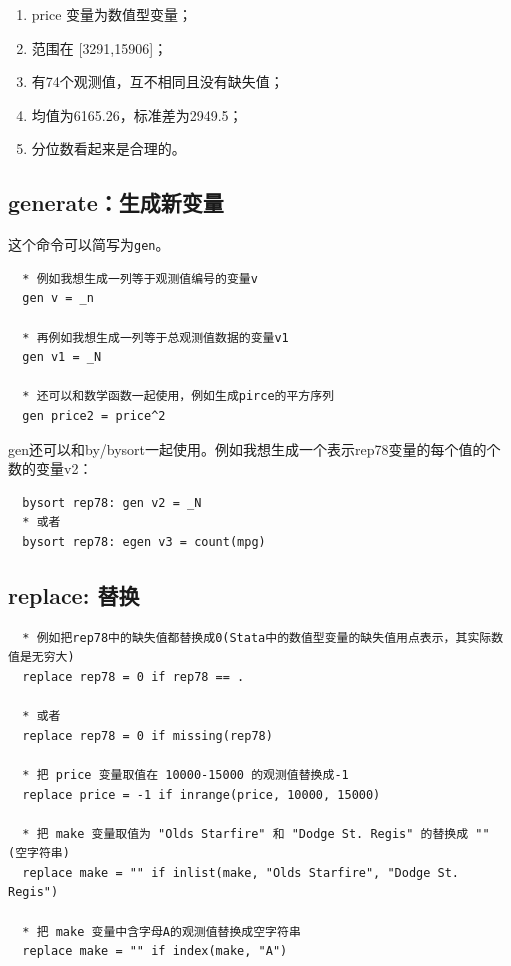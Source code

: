 \documentclass[cn,fancy,blue,11pt]{elegantbook}
\begin{document}
\begin{enumerate}
  \item price 变量为数值型变量；
  \item 范围在 {[}3291,15906{]}；
  \item 有74个观测值，互不相同且没有缺失值；
  \item 均值为6165.26，标准差为2949.5；
  \item 分位数看起来是合理的。
\end{enumerate}

\subsection{generate：生成新变量}
这个命令可以简写为\texttt{gen}。

\begin{lstlisting}
  * 例如我想生成一列等于观测值编号的变量v
  gen v = _n

  * 再例如我想生成一列等于总观测值数据的变量v1
  gen v1 = _N

  * 还可以和数学函数一起使用，例如生成pirce的平方序列
  gen price2 = price^2
\end{lstlisting}

gen还可以和by/bysort一起使用。例如我想生成一个表示rep78变量的每个值的个数的变量v2：

\begin{lstlisting}
  bysort rep78: gen v2 = _N
  * 或者
  bysort rep78: egen v3 = count(mpg)
\end{lstlisting}

\subsection{replace: 替换}

\begin{lstlisting}
  * 例如把rep78中的缺失值都替换成0(Stata中的数值型变量的缺失值用点表示，其实际数值是无穷大)
  replace rep78 = 0 if rep78 == .

  * 或者
  replace rep78 = 0 if missing(rep78)

  * 把 price 变量取值在 10000-15000 的观测值替换成-1
  replace price = -1 if inrange(price, 10000, 15000)

  * 把 make 变量取值为 "Olds Starfire" 和 "Dodge St. Regis" 的替换成 "" (空字符串)
  replace make = "" if inlist(make, "Olds Starfire", "Dodge St. Regis")

  * 把 make 变量中含字母A的观测值替换成空字符串
  replace make = "" if index(make, "A")
\end{lstlisting}
\end{document}
